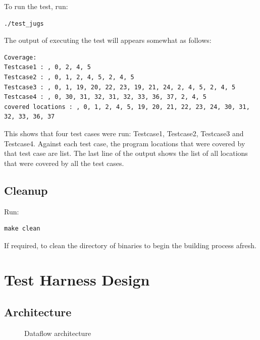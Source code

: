 \documentclass[12pts]{report}
\begin{document}
To run the test, run:
\begin{lstlisting}[style=oc]
	./test_jugs
\end{lstlisting}

The output of executing the test will appears somewhat as follows:
\begin{lstlisting}[style=oc]
Coverage: 
Testcase1 : , 0, 2, 4, 5
Testcase2 : , 0, 1, 2, 4, 5, 2, 4, 5
Testcase3 : , 0, 1, 19, 20, 22, 23, 19, 21, 24, 2, 4, 5, 2, 4, 5
Testcase4 : , 0, 30, 31, 32, 31, 32, 33, 36, 37, 2, 4, 5
covered locations : , 0, 1, 2, 4, 5, 19, 20, 21, 22, 23, 24, 30, 31, 32, 33, 36, 37
\end{lstlisting}

This shows that four test cases were run: Testcase1, Testcase2, Testcase3 and 
Testcase4. Against each test case, the program locations that were covered 
by that test case are list.
The last line of the output shows the list of all locations that were covered by all
the test cases.

\section{Cleanup}
Run:
\begin{lstlisting}[style=oc]
	make clean
\end{lstlisting}

If required, to clean the directory of binaries to begin the building process afresh.

\chapter{Test Harness Design}
\section{Architecture}
\begin{figure}
\begin{center}
\end{center}
\caption{Dataflow architecture}
\label{f:dataflow}
\end{figure}
\end{document}
